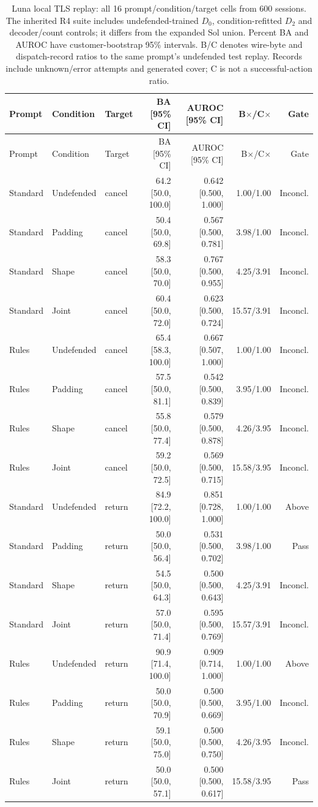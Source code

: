 {\footnotesize
\begin{longtable}{@{}lllrrrr@{}}
\caption{Luna local TLS replay: all 16 prompt/condition/target cells from 600 sessions. The inherited R4 suite includes undefended-trained $D_0$, condition-refitted $D_2$ and decoder/count controls; it differs from the expanded Sol union. Percent BA and AUROC have customer-bootstrap 95\% intervals. B/C denotes wire-byte and dispatch-record ratios to the same prompt's undefended test replay. Records include unknown/error attempts and generated cover; C is not a successful-action ratio.}\label{tab:r7-luna-network}\\
\toprule Prompt & Condition & Target & BA [95\% CI] & AUROC [95\% CI] & B$\times$/C$\times$ & Gate\\\midrule\endfirsthead
\toprule Prompt & Condition & Target & BA [95\% CI] & AUROC [95\% CI] & B$\times$/C$\times$ & Gate\\\midrule\endhead
Standard & Undefended & cancel & 64.2 [50.0, 100.0] & 0.642 [0.500, 1.000] & 1.00/1.00 & Inconcl.\\
Standard & Padding & cancel & 50.4 [50.0, 69.8] & 0.567 [0.500, 0.781] & 3.98/1.00 & Inconcl.\\
Standard & Shape & cancel & 58.3 [50.0, 70.0] & 0.767 [0.500, 0.955] & 4.25/3.91 & Inconcl.\\
Standard & Joint & cancel & 60.4 [50.0, 72.0] & 0.623 [0.500, 0.724] & 15.57/3.91 & Inconcl.\\
Rules & Undefended & cancel & 65.4 [58.3, 100.0] & 0.667 [0.507, 1.000] & 1.00/1.00 & Inconcl.\\
Rules & Padding & cancel & 57.5 [50.0, 81.1] & 0.542 [0.500, 0.839] & 3.95/1.00 & Inconcl.\\
Rules & Shape & cancel & 55.8 [50.0, 77.4] & 0.579 [0.500, 0.878] & 4.26/3.95 & Inconcl.\\
Rules & Joint & cancel & 59.2 [50.0, 72.5] & 0.569 [0.500, 0.715] & 15.58/3.95 & Inconcl.\\
Standard & Undefended & return & 84.9 [72.2, 100.0] & 0.851 [0.728, 1.000] & 1.00/1.00 & Above\\
Standard & Padding & return & 50.0 [50.0, 56.4] & 0.531 [0.500, 0.702] & 3.98/1.00 & Pass\\
Standard & Shape & return & 54.5 [50.0, 64.3] & 0.500 [0.500, 0.643] & 4.25/3.91 & Inconcl.\\
Standard & Joint & return & 57.0 [50.0, 71.4] & 0.595 [0.500, 0.769] & 15.57/3.91 & Inconcl.\\
Rules & Undefended & return & 90.9 [71.4, 100.0] & 0.909 [0.714, 1.000] & 1.00/1.00 & Above\\
Rules & Padding & return & 50.0 [50.0, 70.9] & 0.500 [0.500, 0.669] & 3.95/1.00 & Inconcl.\\
Rules & Shape & return & 59.1 [50.0, 75.0] & 0.500 [0.500, 0.750] & 4.26/3.95 & Inconcl.\\
Rules & Joint & return & 50.0 [50.0, 57.1] & 0.500 [0.500, 0.617] & 15.58/3.95 & Pass\\
\bottomrule\end{longtable}}
